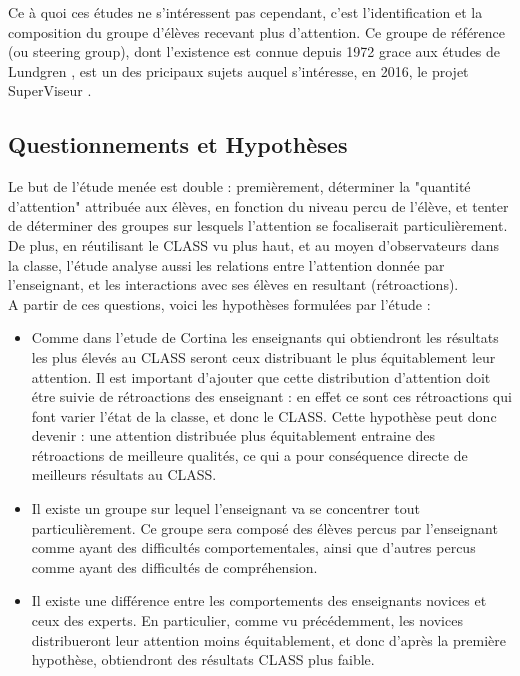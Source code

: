 \documentclass{article}
\begin{document}
Ce à quoi ces études ne s'intéressent pas cependant, c'est l'identification et la composition du groupe d'élèves recevant plus d'attention. Ce groupe de référence (ou steering group), dont l'existence est connue depuis 1972 grace aux études de Lundgren \cite{Lundgren}, est un des pricipaux sujets auquel s'intéresse, en 2016, le projet SuperViseur \cite{SuperViseur}.

\subsection{Questionnements et Hypothèses}
Le but de l'étude menée est double : premièrement, déterminer la "quantité d'attention" attribuée aux élèves, en fonction du niveau percu de l'élève, et tenter de déterminer des groupes sur lesquels l'attention se focaliserait particulièrement. De plus, en réutilisant le CLASS vu plus haut, et au moyen d'observateurs dans la classe, l'étude analyse aussi les relations entre l'attention donnée par l'enseignant, et les interactions avec ses élèves en resultant (rétroactions).\\
A partir de ces questions, voici les hypothèses formulées par l'étude :
\begin{itemize}
  \item Comme dans l'etude de Cortina \cite{Cortina} les enseignants qui obtiendront les résultats les plus élevés au CLASS seront ceux distribuant le plus équitablement leur attention. Il est important d'ajouter que cette distribution d'attention doit étre suivie de rétroactions des enseignant : en effet ce sont ces rétroactions qui font varier l'état de la classe, et donc le CLASS. Cette hypothèse peut donc devenir : une attention distribuée plus équitablement entraine des rétroactions de meilleure qualités, ce qui a pour conséquence directe de meilleurs résultats au CLASS.
  \item Il existe un groupe sur lequel l'enseignant va se concentrer tout particulièrement. Ce groupe sera composé des élèves percus par l'enseignant comme ayant des difficultés comportementales, ainsi que d'autres percus comme ayant des difficultés de compréhension.
  \item Il existe une différence entre les comportements des enseignants novices et ceux des experts. En particulier, comme vu précédemment, les novices distribueront leur attention moins équitablement, et donc d'après la première hypothèse, obtiendront des résultats CLASS plus faible.
\end{itemize}
\end{document}
